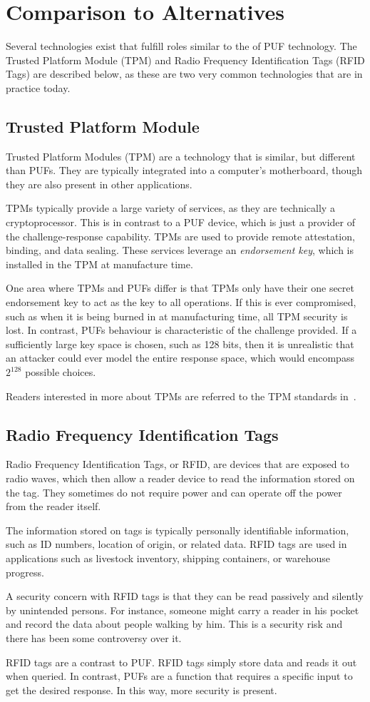 \section{Comparison to Alternatives}
Several technologies exist that fulfill roles similar to the of PUF technology. The Trusted Platform Module (TPM)
and Radio Frequency Identification Tags (RFID Tags) are described below, as these are two very common
technologies that are in practice today.

\subsection{Trusted Platform Module}
Trusted Platform Modules (TPM) are a technology that is similar, but different than PUFs. They are
typically integrated into a computer's motherboard, though they are also present in other applications.

TPMs typically provide a large variety of services, as they are technically a cryptoprocessor. This is in
contrast to a PUF device, which is just a provider of the challenge-response capability. TPMs are used
to provide remote attestation, binding, and data sealing. These services leverage an \textit{endorsement 
key}, which is installed in the TPM at manufacture time.

One area where TPMs and PUFs differ is that TPMs only have their one secret endorsement key to act
as the key to all operations. If this is ever compromised, such as when it is being burned in at
manufacturing time, all TPM security is lost. In contrast, PUFs behaviour is characteristic of the challenge
provided. If a sufficiently large key space is chosen, such as 128 bits, then it is unrealistic that an
attacker could ever model the entire response space, which would encompass $2^{128}$ possible choices.

Readers interested in more about TPMs are referred to the TPM standards in~\cite{tpm}.

\subsection{Radio Frequency Identification Tags}
Radio Frequency Identification Tags, or RFID, are devices that are exposed to radio waves, which then
allow a reader device to read the information stored on the tag. They sometimes do not require power
and can operate off the power from the reader itself.

The information stored on tags is typically personally identifiable information, such as ID numbers,
location of origin, or related data. RFID tags are used in applications such as livestock inventory,
shipping containers, or warehouse progress.

A security concern with RFID tags is that they can be read passively and silently by unintended persons.
For instance, someone might carry a reader in his pocket and record the data about people walking
by him. This is a security risk and there has been some controversy over it.

RFID tags are a contrast to PUF. RFID tags simply store data and reads it out when queried. In contrast,
PUFs are a function that requires a specific input to get the desired response. In this way, more security
is present.
